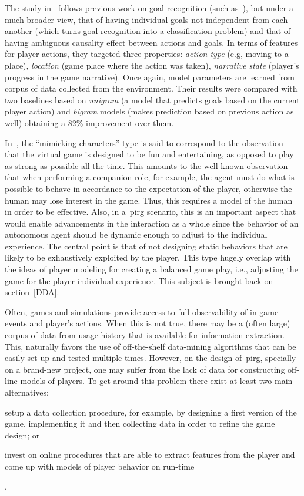 The study in~\cite{ha_goal_2011} follows previous work on goal recognition (such as~\cite{mott_probabilistic_2006}), but under a much broader view, that of having individual goals not independent from each another (which turns goal recognition into a classification problem) and that of having ambiguous causality effect between actions and goals. In terms of features for player actions, they targeted three properties: \textit{action type} (e.g, moving to a place), \textit{location} (game place where the action was taken), \textit{narrative state} (player's progress in the game narrative).  Once again, model parameters are learned from corpus of data collected from the environment. Their results were compared with two baselines based on \textit{unigram} (a model that predicts goals based on the current player action) and \textit{bigram} models (makes prediction based on previous action as well) obtaining a 82\% improvement over them.

In~\cite{herik_opponent_2005}, the ``mimicking characters'' type is said to correspond to the observation that the virtual game is designed to be fun and entertaining, as opposed to play as strong as possible all the time. This amounts to the well-known observation that when performing a companion role, for example, the agent must do what is possible to behave in accordance to the expectation of the player, otherwise the human may lose interest in the game. Thus, this requires a model of the human in order to be effective. Also, in a~\gls{pirg} scenario, this is an important aspect that would enable advancements in the interaction as a whole since the behavior of an autonomous agent should be dynamic enough to adjust to the individual experience. The central point is that of not designing static behaviors that are likely to be exhaustively exploited by the player. This type hugely overlap with the ideas of player modeling for creating a balanced game play, i.e., adjusting the game for the player individual experience. This subject is brought back on section~\ref{DDA}.  

Often, games and simulations provide access to full-observability of in-game events and player's actions. When this is not true, there may be a (often large) corpus of data from usage history that is available for information extraction. This, naturally favors the use of off-the-shelf data-mining algorithms that can be easily set up and tested multiple times. However, on the design of~\gls{pirg}, specially on a brand-new project, one may suffer from the lack of data for constructing off-line models of players. To get around this problem there exist at least two main alternatives: \begin{inparaenum}\item setup a data collection procedure, for example, by designing a first version of the game, implementing it and then collecting data in order to refine the game design; or \item invest on online procedures that are able to extract features from the player and come up with models of player behavior on run-time\end{inparaenum}, %

